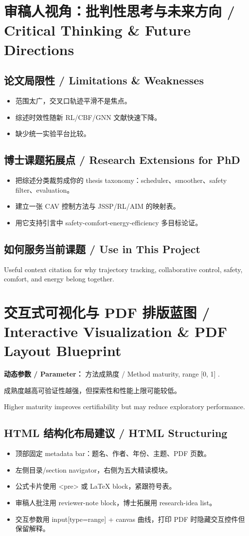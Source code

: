 \documentclass[UTF8,a4paper,11pt,fontset=fandol]{ctexart}
\begin{document}
\section{审稿人视角：批判性思考与未来方向 / Critical Thinking \& Future Directions}
\subsection{论文局限性 / Limitations \& Weaknesses}
\begin{itemize}
\item 范围太广，交叉口轨迹平滑不是焦点。
\item 综述时效性随新 RL/CBF/GNN 文献快速下降。
\item 缺少统一实验平台比较。
\end{itemize}


\subsection{博士课题拓展点 / Research Extensions for PhD}
\begin{itemize}
\item 把综述分类裁剪成你的 thesis taxonomy：scheduler、smoother、safety filter、evaluation。
\item 建立一张 CAV 控制方法与 JSSP/RL/AIM 的映射表。
\item 用它支持引言中 safety-comfort-energy-efficiency 多目标论证。
\end{itemize}


\subsection{如何服务当前课题 / Use in This Project}
Useful context citation for why trajectory tracking, collaborative control, safety, comfort, and energy belong together.

\section{交互式可视化与 PDF 排版蓝图 / Interactive Visualization \& PDF Layout Blueprint}
\textbf{动态参数 / Parameter：} 方法成熟度 / Method maturity, range [0, 1] .

成熟度越高可验证性越强，但探索性和性能上限可能较低。

Higher maturity improves certifiability but may reduce exploratory performance.

\subsection{HTML 结构化布局建议 / HTML Structuring}
\begin{itemize}
\item 顶部固定 metadata bar：题名、作者、年份、主题、PDF 页数。
\item 左侧目录/section navigator，右侧为五大精读模块。
\item 公式卡片使用 <pre> 或 LaTeX block，紧跟符号表。
\item 审稿人批注用 reviewer-note block，博士拓展用 research-idea list。
\item 交互参数用 input[type=range] + canvas 曲线，打印 PDF 时隐藏交互控件但保留解释。
\end{itemize}
\end{document}
